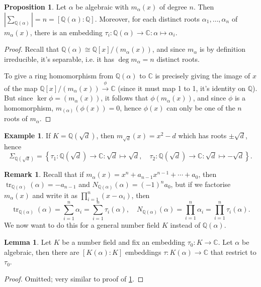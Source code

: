 \documentclass{article}
\newcommand{\Q}{\mathbb{Q}}
\newcommand{\C}{\mathbb{C}}
\newcommand{\tr}{\operatorname{tr}}
\theoremstyle{definition}
\newtheorem{prop}[defn]{Proposition}
\newtheorem{lemma}[defn]{Lemma}
\newtheorem{example}[defn]{Example}
\newtheorem{remark}[defn]{Remark}
\begin{document}
\begin{prop}
\label{prop:embsofsimpext}
Let $\alpha$ be algebraic with $m_\alpha(x)$ of degree $n$. Then $\left|\sum_{\Q(\alpha)}\right|=n=\left[\Q(\alpha):\Q\right]$. Moreover, for each distinct roots $\alpha_1,\ldots,\alpha_n$ of $m_\alpha(x)$, there is an embedding $\tau_i:\Q(\alpha)\rightarrow\C:\alpha\mapsto\alpha_i$.
\end{prop}
\begin{proof}
Recall that $\Q(\alpha)\cong\Q[x]/(m_\alpha(x))$, and since $m_\alpha$ is by definition irreducible, it's separable, i.e. it has $\deg m_\alpha=n$ distinct roots.

To give a ring homomorphism from $\Q(\alpha)$ to $\C$ is precisely giving the image of $x$ of the map $\Q[x]/(m_\alpha(x)) \xrightarrow{\phi} \C$ (since it must map 1 to 1, it's identity on $\Q$). But since $\ker\phi=(m_\alpha(x))$, it follows that $\phi(m_\alpha(x))$, and since $\phi$ is a homomorphism, $m_(\alpha)(\phi(x))=0$, hence $\phi(x)$ can only be one of the $n$ roots of $m_\alpha$.
\end{proof}

\begin{example}
If $K=\Q\left(\sqrt d\right)$, then $m_{\sqrt d}(x)=x^2-d$ which has roots $\pm\sqrt d$, hence
\[
\Sigma_{\Q\left(\sqrt d\right)}=\left\{\tau_1:\Q\left(\sqrt d\right)\rightarrow\C:\sqrt{d}\mapsto\sqrt{d},\quad\tau_2:\Q\left(\sqrt d\right)\rightarrow\C:\sqrt d\mapsto -\sqrt d\right\}.
\]
\end{example}

\begin{remark}
Recall that if $m_\alpha(x)=x^n+a_{n-1}x^{n-1}+\cdots+a_0$, then $\tr_{\Q(\alpha)}(\alpha)=-a_{n-1}$ and $N_{\Q(\alpha)}(\alpha)=(-1)^n a_0$, but if we factorise $m_\alpha(x)$ and write it as $\prod_{i=1}^n(x-\alpha_i)$, then
\[
\tr_{\Q(\alpha)}(\alpha)=\sum_{i=1}^n\alpha_i=\sum_{i=1}^n\tau_i(\alpha),\quad N_{\Q(\alpha)}(\alpha)=\prod_{i=1}^n\alpha_i=\prod_{i=1}^n\tau_i(\alpha).
\]
We now want to do this for a general number field $K$ instead of $\Q(\alpha)$.
\end{remark}

\begin{lemma}
\label{lemma:genextembs}
Let $K$ be a number field and fix an embedding $\tau_0:K\rightarrow\C$. Let $\alpha$ be algebraic, then there are $[K(\alpha):K]$ embeddings $\tau:K(\alpha)\rightarrow\C$ that restrict to $\tau_0$.
\end{lemma}
\begin{proof}
Omitted; very similar to proof of \ref{prop:embsofsimpext}.
\end{proof}
\end{document}
